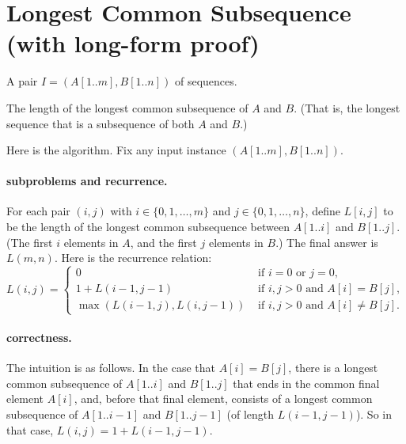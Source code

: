 
\section{Longest Common Subsequence (with long-form proof)}\label{dp: sec: LCS}

\begin{mylist}
\item[\bf input:]
  A pair $I=(A[1..m], B[1..n])$ of sequences.

\item[\bf output:]
  The length of the longest common subsequence of $A$ and $B$.
  (That is, the longest sequence that is a subsequence of both $A$ and $B$.)
\end{mylist}

\noindent
Here is the algorithm. Fix any input instance $(A[1..m], B[1..n])$.

\paragraph{subproblems and recurrence.}
For each pair $(i, j)$ with $i\in\{0,1,\ldots, m\}$ and $j\in\{0,1,\ldots,n\}$,
define $L[i, j]$ to be the length of the longest common subsequence
between $A[1..i]$ and $B[1..j]$.  (The first $i$ elements in $A$,
and the first $j$ elements in $B$.)  The final answer is $L(m, n)$.
Here is the recurrence relation:
\[\displaystyle L(i, j) =
  \begin{cases}
    0 & \text{ if } i=0 \text{ or } j=0,  \\
    1 + L(i-1, j-1) & \text{ if } i, j > 0 \text{ and } A[i] = B[j], \\
    \max (L(i-1, j), L(i, j-1)) & \text{ if } i, j > 0 \text{ and } A[i] \ne B[j].
  \end{cases}\]

\paragraph{correctness.}
The intuition is as follows.
In the case that $A[i] = B[j]$,
there is a longest common subsequence of $A[1..i]$ and $B[1..j]$
that ends in the common final element $A[i]$,
and, before that final element, consists of
a longest common subsequence of $A[1..i-1]$ and $B[1..j-1]$
(of length $L(i-1, j-1)$).
So in that case, $L(i,j) = 1 + L(i-1, j-1)$.

